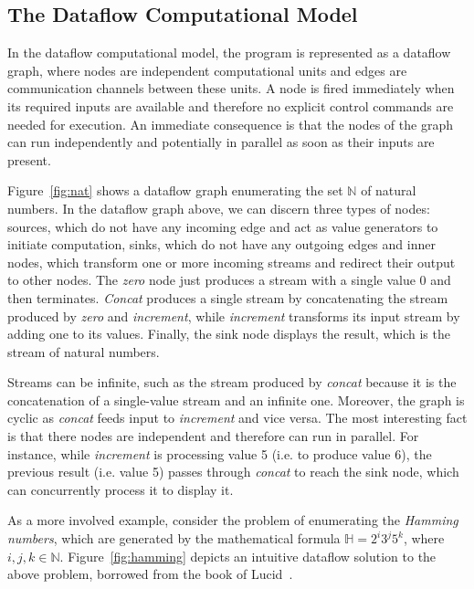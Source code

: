 \documentclass[sigplan,screen,10pt]{acmart}
\begin{document}
\subsection{The Dataflow Computational Model}
In the dataflow computational model, the program is represented as a dataflow graph, where
nodes are independent computational units and edges are communication channels
between these units. A node is fired immediately when its required inputs are
available and therefore no explicit control commands are needed for execution.
An immediate consequence is that the nodes of the graph can run independently
and potentially in parallel as soon as their inputs are present.

Figure~\ref{fig:nat} shows a dataflow graph enumerating the set $\mathbb{N}$ of
natural numbers.
%
%
In the dataflow graph above, we can discern three types of nodes: sources, which
do not have any incoming edge and act as value generators to initiate
computation, sinks, which do not have any outgoing edges and inner nodes, which
transform one or more incoming streams and redirect their output to other nodes.
The \textit{zero} node just produces a stream with a single value 0 and then
terminates. \textit{Concat} produces a single stream by concatenating the stream
produced by \textit{zero} and \textit{increment}, while \textit{increment}
transforms its input stream by adding one to its values. Finally, the sink node
displays the result, which is the stream of natural numbers.

Streams can be infinite, such as the stream produced by \textit{concat} because
it is the concatenation of a single-value stream and an infinite one. Moreover,
the graph is cyclic as \textit{concat} feeds input to \textit{increment} and
vice versa. The most interesting fact is that there nodes are independent and
therefore can run in parallel. For instance, while \textit{increment} is
processing value 5 (i.e. to produce value 6), the previous result (i.e. value 5)
passes through \textit{concat} to reach the sink node, which can concurrently
process it to display it.

As a more involved example, consider the problem of enumerating the
\textit{Hamming numbers}, which are generated by the mathematical formula
$\mathbb{H} = 2^i3^j5^k$, where $i,j,k \in \mathbb{N}$. Figure~\ref{fig:hamming}
depicts an intuitive dataflow solution to the above problem, borrowed from the book of Lucid~\cite{lucid}.
%
\end{document}
